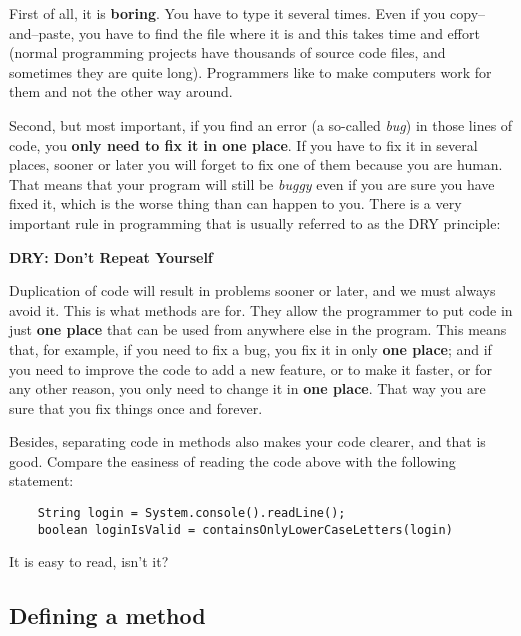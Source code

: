 First of all, it is \textbf{boring}. You have to type it several
times. Even if you copy--and--paste, you have to find the file where
it is and this takes time and effort 
(normal programming projects have thousands of source
code files, and sometimes they are quite long). Programmers like to
make computers work for them and not the other way around.

Second, but most important, if you find an error (a so-called
\emph{bug}) in those lines of code, you \textbf{only need to fix it in one
place}. If you have to fix it in several places, sooner or later you
will forget to fix one of them because you are human. That means that your
program will still be \emph{buggy} even if you are sure you have fixed
it, which is the worse thing than can happen to you. There is a very
important rule in programming that is usually referred to as the DRY
principle: 

\begin{center}
\vspace{1em}
\textbf{\large DRY: Don't Repeat Yourself}
\vspace{1em}
\end{center}

Duplication of code will result in problems sooner or later, and
we must always avoid it. This is what methods are for. They allow the
programmer to put code in just \textbf{one place} 
that can be used from
anywhere else in the program. This means that, for example, if you
need to fix a bug, you fix it in only \textbf{one place}; 
and if you need to
improve the code to add a new feature, or to make it faster, or for
any other reason, you only need to change it 
in \textbf{one place}. That way
you are sure that you fix things once and forever. 

Besides, separating code in methods also makes your code
clearer, and that is good. 
Compare the easiness of reading the code above with the
following statement: 

\begin{verbatim}
    String login = System.console().readLine();
    boolean loginIsValid = containsOnlyLowerCaseLetters(login)
\end{verbatim}

It is easy to read, isn't it?

\subsection{Defining a method}

